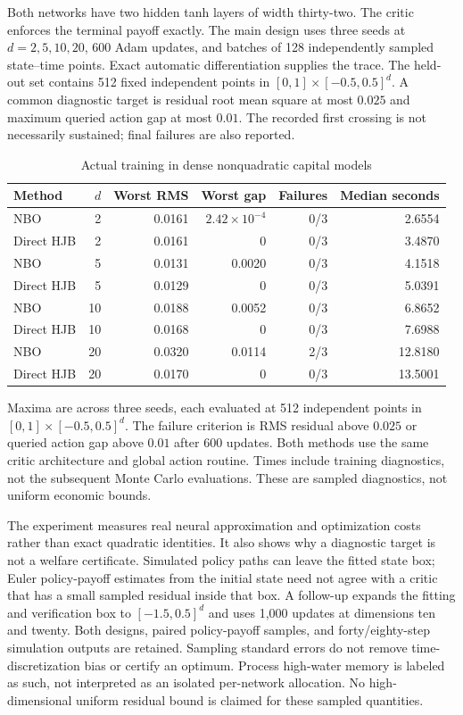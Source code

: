 Both networks have two hidden tanh layers of width thirty-two. The critic enforces the terminal payoff exactly. The main design uses three seeds at $d=2,5,10,20$, 600 Adam updates, and batches of 128 independently sampled state--time points. Exact automatic differentiation supplies the trace. The held-out set contains 512 fixed independent points in $[0,1]\times[-0.5,0.5]^d$. A common diagnostic target is residual root mean square at most $0.025$ and maximum queried action gap at most $0.01$. The recorded first crossing is not necessarily sustained; final failures are also reported.

\begin{table}[t]\centering
\caption{Actual training in dense nonquadratic capital models}\label{tab:coupled-r6}
\small\begin{tabular}{lrrrrr}
\toprule
Method & $d$ & Worst RMS & Worst gap & Failures & Median seconds\\\midrule
NBO & 2 & 0.0161 & $2.42\times10^{-4}$ & 0/3 & 2.6554\\
Direct HJB & 2 & 0.0161 & 0 & 0/3 & 3.4870\\
NBO & 5 & 0.0131 & 0.0020 & 0/3 & 4.1518\\
Direct HJB & 5 & 0.0129 & 0 & 0/3 & 5.0391\\
NBO & 10 & 0.0188 & 0.0052 & 0/3 & 6.8652\\
Direct HJB & 10 & 0.0168 & 0 & 0/3 & 7.6988\\
NBO & 20 & 0.0320 & 0.0114 & 2/3 & 12.8180\\
Direct HJB & 20 & 0.0170 & 0 & 0/3 & 13.5001\\
\bottomrule\end{tabular}
\par\smallskip\footnotesize Maxima are across three seeds, each evaluated at 512 independent points in $[0,1]\times[-0.5,0.5]^d$. The failure criterion is RMS residual above $0.025$ or queried action gap above $0.01$ after 600 updates. Both methods use the same critic architecture and global action routine. Times include training diagnostics, not the subsequent Monte Carlo evaluations. These are sampled diagnostics, not uniform economic bounds.
\end{table}


The experiment measures real neural approximation and optimization costs rather than exact quadratic identities. It also shows why a diagnostic target is not a welfare certificate. Simulated policy paths can leave the fitted state box; Euler policy-payoff estimates from the initial state need not agree with a critic that has a small sampled residual inside that box. A follow-up expands the fitting and verification box to $[-1.5,0.5]^d$ and uses 1,000 updates at dimensions ten and twenty. Both designs, paired policy-payoff samples, and forty/eighty-step simulation outputs are retained. Sampling standard errors do not remove time-discretization bias or certify an optimum. Process high-water memory is labeled as such, not interpreted as an isolated per-network allocation. No high-dimensional uniform residual bound is claimed for these sampled quantities.



